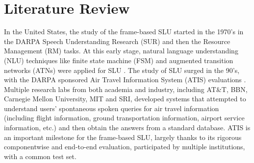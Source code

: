 \chapter{Literature Review}

In the United States, the study of the frame-based SLU started in the 1970’s in the DARPA
Speech Understanding Research (SUR) and then the Resource Management (RM) tasks. At
this early stage, natural language understanding (NLU) techniques like finite state machine
(FSM) and augmented transition networks (ATNs) were applied for SLU \cite{d1e535}. The
study of SLU surged in the 90’s, with the DARPA sponsored Air Travel Information System
(ATIS) evaluations \cite{dahl}. Multiple research labs from both
academia and industry, including AT\&T, BBN, Carnegie Mellon University, MIT and SRI,
developed systems that attempted to understand users’ spontaneous spoken queries for air
travel information (including flight information, ground transportation information, airport
service information, etc.) and then obtain the answers from a standard database. ATIS is an important milestone for the frame-based SLU, largely thanks to its rigorous componentwise
and end-to-end evaluation, participated by multiple institutions, with a common test set.


